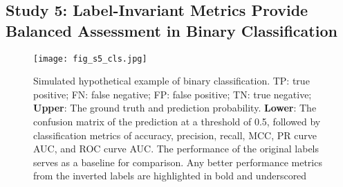 \subsection{Study 5: Label-Invariant Metrics Provide Balanced Assessment in Binary Classification}

\begin{figure}[h]
    \centering
    \texttt{[image: fig\_s5\_cls.jpg]}
    \caption{Simulated hypothetical example of binary classification. TP: true positive; FN: false negative; FP: false positive; TN: true negative; \textbf{Upper}: The ground truth and prediction probability. \textbf{Lower}: The confusion matrix of the prediction at a threshold of 0.5, followed by classification metrics of accuracy, precision, recall, MCC, PR curve AUC, and ROC curve AUC. The performance of the original labels serves as a baseline for comparison. Any better performance metrics from the inverted labels are highlighted in bold and underscored}
    \label{fig:s5_cls}
\end{figure}


